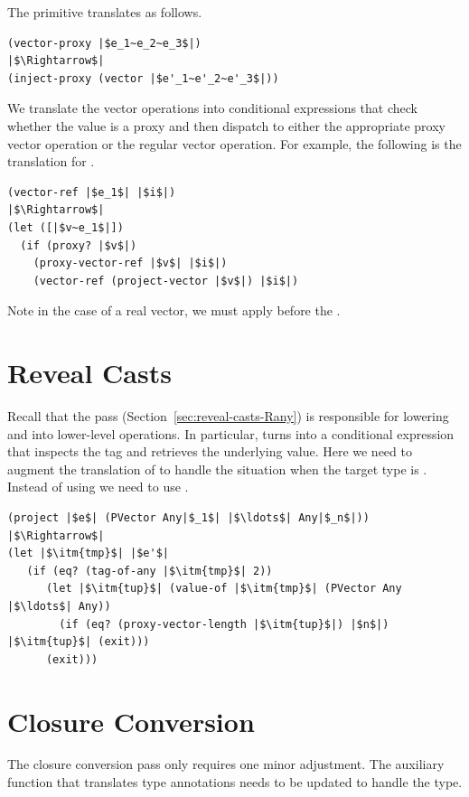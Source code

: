 \documentclass[7x10]{TimesAPriori_MIT}%
\begin{document}
The  primitive translates as follows.
\begin{lstlisting}
(vector-proxy |$e_1~e_2~e_3$|)
|$\Rightarrow$|
(inject-proxy (vector |$e'_1~e'_2~e'_3$|))
\end{lstlisting}

We translate the vector operations into conditional expressions that
check whether the value is a proxy and then dispatch to either the
appropriate proxy vector operation or the regular vector operation.
For example, the following is the translation for .
\begin{lstlisting}
(vector-ref |$e_1$| |$i$|)
|$\Rightarrow$|
(let ([|$v~e_1$|])
  (if (proxy? |$v$|)
    (proxy-vector-ref |$v$| |$i$|)
    (vector-ref (project-vector |$v$|) |$i$|)
\end{lstlisting}
Note in the case of a real vector, we must apply 
before the .

\section{Reveal Casts}
\label{sec:reveal-casts-gradual}

Recall that the  pass
(Section~\ref{sec:reveal-casts-Rany}) is responsible for lowering
 and  into lower-level operations.  In
particular,  turns into a conditional expression that
inspects the tag and retrieves the underlying value.  Here we need to
augment the translation of  to handle the situation when
the target type is .  Instead of using
 we need to use .
\begin{lstlisting}
(project |$e$| (PVector Any|$_1$| |$\ldots$| Any|$_n$|))
|$\Rightarrow$|
(let |$\itm{tmp}$| |$e'$|
   (if (eq? (tag-of-any |$\itm{tmp}$| 2))
      (let |$\itm{tup}$| (value-of |$\itm{tmp}$| (PVector Any |$\ldots$| Any))
        (if (eq? (proxy-vector-length |$\itm{tup}$|) |$n$|) |$\itm{tup}$| (exit)))
      (exit)))
\end{lstlisting}


\section{Closure Conversion}
\label{sec:closure-conversion-gradual}

The closure conversion pass only requires one minor adjustment.  The
auxiliary function that translates type annotations needs to be
updated to handle the  type.
\end{document}
